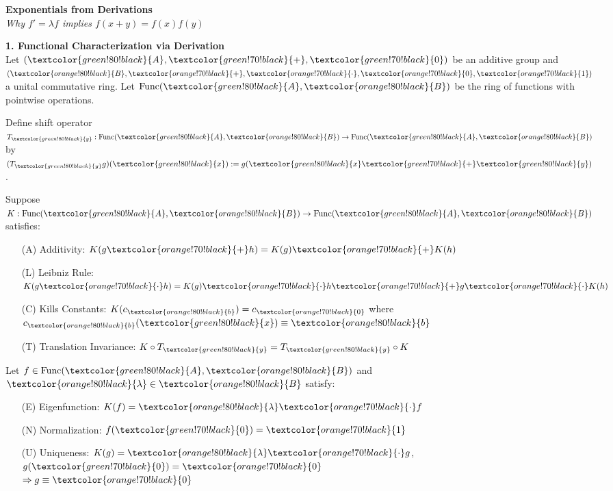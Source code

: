 \newcommand{\A}[1]{\textcolor{green!80!black}{#1}}          %
\newcommand{\B}[1]{\textcolor{orange!80!black}{#1}} %
\newcommand{\F}[1]{\textcolor{blue!60!black}{#1}}   %
\newcommand{\OpA}[1]{\textcolor{green!70!black}{#1}}        %
\newcommand{\OpB}[1]{\textcolor{orange!70!black}{#1}} %

\begin{technical}
{\Large\textbf{Exponentials from Derivations}}\\[0.5em]
\textit{Why \( f' = \lambda f \) implies \( f(x+y) = f(x)f(y) \)}

\vspace{0.5em}
\noindent\textbf{1. Functional Characterization via Derivation}\\[-0.5em]

Let \( (\A{A}, \OpA{+}, \OpA{0}) \) be an additive group and \( (\B{B}, \OpB{+}, \OpB{\cdot}, \OpB{0}, \OpB{1}) \) a unital commutative ring. Let \( \mathrm{Func}(\A{A}, \B{B}) \) be the ring of functions with pointwise operations.

Define shift operator \( T_{\A{y}}: \mathrm{Func}(\A{A}, \B{B}) \to \mathrm{Func}(\A{A}, \B{B}) \) by \( (T_{\A{y}}g)(\A{x}) := g(\A{x} \OpA{+} \A{y}) \).

Suppose \( K: \mathrm{Func}(\A{A}, \B{B}) \to \mathrm{Func}(\A{A}, \B{B}) \) satisfies:

\vspace{-0.5em}
\begin{itemize}[leftmargin=3em,topsep=0pt,itemsep=0pt]
  \item[(A)] Additivity: \( K(g \OpB{+} h) = K(g) \OpB{+} K(h) \)
  \item[(L)] Leibniz Rule: \( K(g \OpB{\cdot} h) = K(g) \OpB{\cdot} h \OpB{+} g \OpB{\cdot} K(h) \)
  \item[(C)] Kills Constants: \( K(c_{\B{b}}) = c_{\OpB{0}} \) where \( c_{\B{b}}(\A{x}) \equiv \B{b} \)
  \item[(T)] Translation Invariance: \( K \circ T_{\A{y}} = T_{\A{y}} \circ K \)
\end{itemize}

Let \( f \in \mathrm{Func}(\A{A}, \B{B}) \) and \( \B{\lambda} \in \B{B} \) satisfy:

\vspace{-0.5em}
\begin{itemize}[leftmargin=3em,topsep=0pt,itemsep=0pt]
  \item[(E)] Eigenfunction: \( K(f) = \B{\lambda} \OpB{\cdot} f \)
  \item[(N)] Normalization: \( f(\OpA{0}) = \OpB{1} \)
  \item[(U)] Uniqueness: \( K(g) = \B{\lambda} \OpB{\cdot} g \), \( g(\OpA{0}) = \OpB{0} \)\\
    \( \Rightarrow g \equiv \OpB{0} \)
\end{itemize}


\end{technical}
